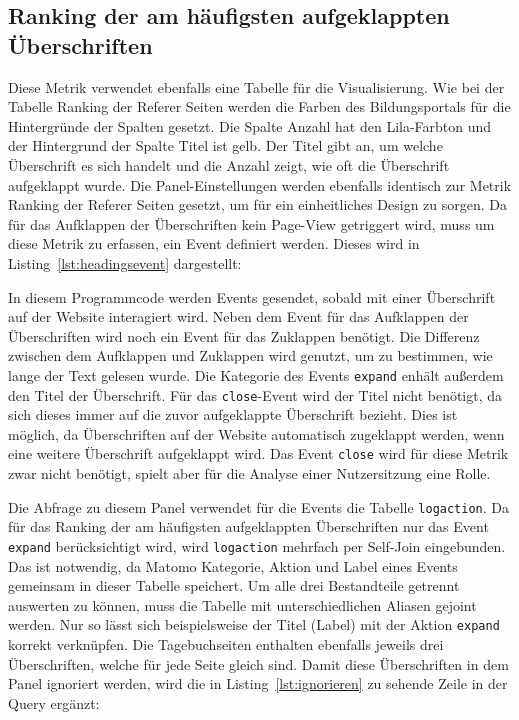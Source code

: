 \subsection{Ranking der am häufigsten aufgeklappten Überschriften}
Diese Metrik verwendet ebenfalls eine Tabelle für die Visualisierung. Wie bei der Tabelle \glqq Ranking der Referer Seiten\grqq{} werden die Farben des Bildungsportals für die Hintergründe der Spalten gesetzt. Die Spalte \glqq Anzahl\grqq{} hat den Lila-Farbton und der Hintergrund der Spalte \glqq Titel\grqq{} ist gelb. Der \glqq Titel\grqq{} gibt an, um welche Überschrift es sich handelt und die \glqq Anzahl\grqq{} zeigt, wie oft die Überschrift aufgeklappt wurde. Die Panel-Einstellungen werden ebenfalls identisch zur Metrik \glqq Ranking der Referer Seiten\grqq{} gesetzt, um für ein einheitliches Design zu sorgen. Da für das Aufklappen der Überschriften kein Page-View getriggert wird, muss um diese Metrik zu erfassen, ein Event definiert werden. Dieses wird in Listing~\ref{lst:headingsevent} dargestellt:

\begin{figure}[H]
    \centering
    \begin{minipage}{\textwidth}
        
    \end{minipage}
\end{figure}

In diesem Programmcode werden Events gesendet, sobald mit einer Überschrift auf der Website interagiert wird. Neben dem Event für das Aufklappen der Überschriften wird noch ein Event für das Zuklappen benötigt. Die Differenz zwischen dem Aufklappen und Zuklappen wird genutzt, um zu bestimmen, wie lange der Text gelesen wurde. Die Kategorie des Events \texttt{expand} enhält außerdem den Titel der Überschrift. Für das \texttt{close}-Event wird der Titel nicht benötigt, da sich dieses immer auf die zuvor aufgeklappte Überschrift bezieht. Dies ist möglich, da Überschriften auf der Website automatisch zugeklappt werden, wenn eine weitere Überschrift aufgeklappt wird. Das Event \texttt{close} wird für diese Metrik zwar nicht benötigt, spielt aber für die Analyse einer Nutzersitzung eine Rolle.

Die Abfrage zu diesem Panel verwendet für die Events die Tabelle \texttt{log\textunderscore action}. Da für das \glqq Ranking der am häufigsten aufgeklappten Überschriften\grqq{} nur das Event \texttt{expand} berücksichtigt wird, wird \texttt{log\textunderscore action} mehrfach per Self-Join eingebunden. Das ist notwendig, da Matomo Kategorie, Aktion und Label eines Events gemeinsam in dieser Tabelle speichert. Um alle drei Bestandteile getrennt auswerten zu können, muss die Tabelle mit unterschiedlichen Aliasen gejoint werden. Nur so lässt sich beispielsweise der Titel (Label) mit der Aktion \texttt{expand} korrekt verknüpfen. Die Tagebuchseiten enthalten ebenfalls jeweils drei Überschriften, welche für jede Seite gleich sind. Damit diese Überschriften in dem Panel ignoriert werden, wird die in Listing~\ref{lst:ignorieren} zu sehende Zeile in der Query ergänzt: 

